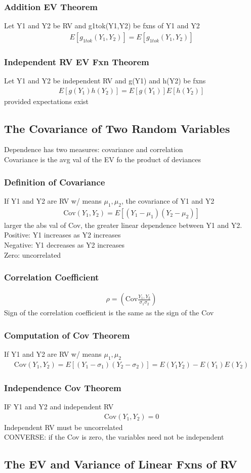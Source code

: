 \documentclass[12pt]{article}
\begin{document}
	\subsubsection{Addition EV Theorem}
		Let Y1 and Y2 be RV and  g1tok(Y1,Y2) be fxns of Y1 and Y2
		\begin{align*}
			E[g_{1tok}(Y_1, Y_2)] = E[g_{1tok}(Y_1, Y_2)]
		\end{align*}
	\subsubsection{Independent RV EV Fxn Theorem}
		Let Y1 and Y2 be independent RV and g(Y1) and h(Y2) be fxns
		\begin{align*}
			E[g(Y_1)h(Y_2)] = E[g(Y_1)]E[h(Y_2)]
		\end{align*}
		provided expectations exist
\subsection{The Covariance of Two Random Variables}
	Dependence has two measures: covariance and correlation\\
	Covariance is the avg val of the EV fo the product of deviances
	\subsubsection{Definition of Covariance}
		If Y1 and Y2 are RV w/ means $ \mu_1, \mu_2 $, the covariance
		of Y1 and Y2
		\begin{align*}
			\text{Cov}(Y_1, Y_2) = E[(Y_1 - \mu_1)(Y_2 - \mu_2)]
		\end{align*}
		larger the abs val of Cov, the greater linear dependence between
		Y1 and Y2. \\
		Positive: Y1 increases as Y2 increases\\
		Negative: Y1 decreases as Y2 increases\\
		Zero: uncorrelated
	\subsubsection{Correlation Coefficient}
		\begin{align*}
			\rho = (\text{Cov}\frac{Y_1, Y_2}{\sigma_1\sigma_2})
		\end{align*}
		Sign of the correlation coefficient is the same as the sign of the 
		Cov
	\subsubsection{Computation of Cov Theorem}
		If Y1 and Y2 are RV w/ means $ \mu_1, \mu_2 $
		\begin{align*}
			\text{Cov}(Y_1, Y_2) = E[(Y_1 - \sigma_1)(Y_2 - \sigma_2)] = 
			E(Y_1Y_2) - E(Y_1)E(Y_2)
		\end{align*}
	\subsubsection{Independence Cov Theorem}
		IF Y1 and Y2 and independent RV
		\begin{align*}
			\text{Cov}(Y_1, Y_2) = 0
		\end{align*}
		Independent RV must be uncorrelated\\
		CONVERSE: if the Cov is zero, the variables need not be independent
\subsection{The EV and Variance of Linear Fxns of RV}
\end{document}
